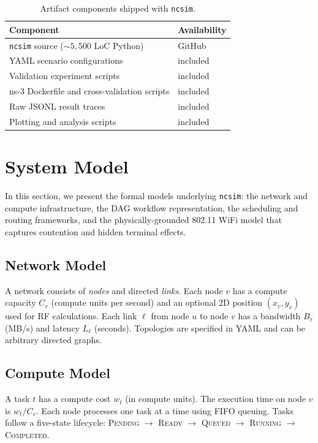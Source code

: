 \documentclass[conference]{IEEEtran}
\newcommand{\ncsim}{\texttt{ncsim}}
\begin{document}
\begin{table}[t]
\centering
\caption{Artifact components shipped with \ncsim{}.}
\label{tab:artifact}
\begin{tabular}{@{}lp{4.2cm}@{}}
\toprule
\textbf{Component} & \textbf{Availability} \\
\midrule
\ncsim{} source (${\sim}5{,}500$ LoC Python) & GitHub \\
YAML scenario configurations & included \\
Validation experiment scripts & included \\
ns-3 Dockerfile and cross-validation scripts & included \\
Raw JSONL result traces & included \\
Plotting and analysis scripts & included \\
\bottomrule
\end{tabular}
\end{table}


\section{System Model}
\label{sec:model}

In this section, we present the formal models underlying \ncsim{}: the
network and compute infrastructure, the DAG workflow representation,
the scheduling and routing frameworks, and the physically-grounded
802.11 WiFi model that captures contention and hidden terminal effects.

\subsection{Network Model}

A network consists of \emph{nodes} and directed \emph{links}.  Each node $v$
has a compute capacity $C_v$ (compute units per second) and an optional 2D
position $(x_v, y_v)$ used for RF calculations.  Each link $\ell$ from node
$u$ to node $v$ has a bandwidth $B_\ell$ (MB/s) and latency $L_\ell$
(seconds).  Topologies are specified in YAML and can be arbitrary directed
graphs.

\subsection{Compute Model}

A task $t$ has a compute cost $w_t$ (in compute units).  The execution time
on node $v$ is $w_t / C_v$.  Each node processes one task at a time using
FIFO queuing.  Tasks follow a five-state lifecycle: \textsc{Pending}
$\rightarrow$ \textsc{Ready} $\rightarrow$ \textsc{Queued} $\rightarrow$
\textsc{Running} $\rightarrow$ \textsc{Completed}.
\end{document}
